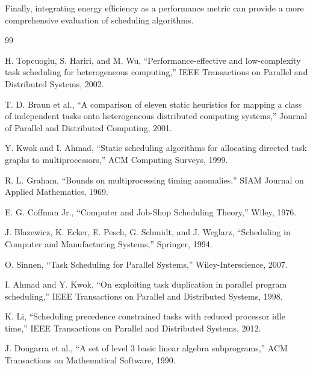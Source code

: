 \documentclass[12pt,a4paper]{article}
\begin{document}
Finally, integrating energy efficiency as a performance metric can provide a more comprehensive evaluation of scheduling algorithms.
	\newpage
	\begin{thebibliography}{99}

H. Topcuoglu, S. Hariri, and M. Wu, “Performance-effective and low-complexity task scheduling for heterogeneous computing,” IEEE Transactions on Parallel and Distributed Systems, 2002.

T. D. Braun et al., “A comparison of eleven static heuristics for mapping a class of independent tasks onto heterogeneous distributed computing systems,” Journal of Parallel and Distributed Computing, 2001.

Y. Kwok and I. Ahmad, “Static scheduling algorithms for allocating directed task graphs to multiprocessors,” ACM Computing Surveys, 1999.

R. L. Graham, “Bounds on multiprocessing timing anomalies,” SIAM Journal on Applied Mathematics, 1969.

E. G. Coffman Jr., “Computer and Job-Shop Scheduling Theory,” Wiley, 1976.

J. Blazewicz, K. Ecker, E. Pesch, G. Schmidt, and J. Weglarz, “Scheduling in Computer and Manufacturing Systems,” Springer, 1994.

O. Sinnen, “Task Scheduling for Parallel Systems,” Wiley-Interscience, 2007.

I. Ahmad and Y. Kwok, “On exploiting task duplication in parallel program scheduling,” IEEE Transactions on Parallel and Distributed Systems, 1998.

K. Li, “Scheduling precedence constrained tasks with reduced processor idle time,” IEEE Transactions on Parallel and Distributed Systems, 2012.

J. Dongarra et al., “A set of level 3 basic linear algebra subprograms,” ACM Transactions on Mathematical Software, 1990.

\end{thebibliography}

  
     
\end{document}
